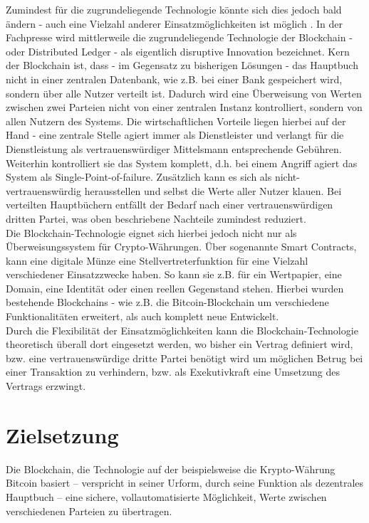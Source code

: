 Zumindest für die zugrundeliegende Technologie könnte sich dies jedoch bald ändern - auch eine Vielzahl anderer Einsatzmöglichkeiten ist möglich . In der Fachpresse wird mittlerweile die zugrundeliegende Technologie der \gls{Blockchain} - oder Distributed Ledger - als eigentlich disruptive Innovation bezeichnet. Kern der \gls{Blockchain} ist, dass - im Gegensatz zu bisherigen Lösungen - das Hauptbuch nicht in einer zentralen Datenbank, wie z.B. bei einer Bank gespeichert wird, sondern über alle Nutzer verteilt ist. Dadurch wird eine Überweisung von Werten zwischen zwei Parteien nicht von einer zentralen Instanz kontrolliert, sondern von allen Nutzern des Systems. Die wirtschaftlichen Vorteile liegen hierbei auf der Hand - eine zentrale Stelle agiert immer als Dienstleister und verlangt für die Dienstleistung als vertrauenswürdiger Mittelsmann entsprechende Gebühren. Weiterhin kontrolliert sie das System komplett, d.h. bei einem Angriff agiert das System als Single-Point-of-failure. Zusätzlich kann es sich als nicht-vertrauenswürdig herausstellen und selbst die Werte aller Nutzer klauen. Bei verteilten Hauptbüchern entfällt der Bedarf nach einer vertrauenswürdigen dritten Partei, was oben beschriebene Nachteile zumindest reduziert. \\

Die Blockchain-Technologie eignet sich hierbei jedoch nicht nur als Überweisungssystem für Crypto-Währungen. Über sogenannte Smart Contracts, kann eine digitale Münze eine Stellvertreterfunktion für eine Vielzahl verschiedener Einsatzzwecke haben. So kann sie z.B. für ein Wertpapier, eine Domain, eine Identität oder einen reellen Gegenstand stehen. Hierbei wurden bestehende Blockchains - wie z.B. die Bitcoin-Blockchain um verschiedene Funktionalitäten erweitert, als auch komplett neue Entwickelt. \\

Durch die Flexibilität der Einsatzmöglichkeiten kann die Blockchain-Technologie theoretisch überall dort eingesetzt werden, wo bisher ein Vertrag definiert wird, bzw. eine vertrauenswürdige dritte Partei benötigt wird um möglichen Betrug bei einer Transaktion zu verhindern, bzw. als Exekutivkraft eine Umsetzung des Vertrags erzwingt. 

\section{Zielsetzung}
Die Blockchain, die Technologie auf der beispielsweise die Krypto-Währung Bitcoin basiert – verspricht in seiner Urform, durch seine Funktion als dezentrales Hauptbuch – eine sichere, vollautomatisierte Möglichkeit, Werte zwischen verschiedenen Parteien zu übertragen.\\

